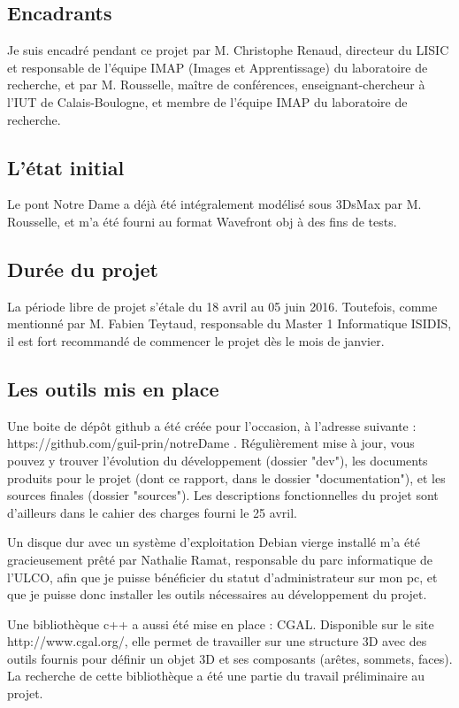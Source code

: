 \documentclass[a4paper,french]{article}
\begin{document}
		\subsection{Encadrants}
			Je suis encadré pendant ce projet par M. Christophe Renaud, directeur du LISIC et responsable de l'équipe IMAP (Images et Apprentissage) du laboratoire de recherche, et par M. Rousselle, maître de conférences, enseignant-chercheur à l'IUT de Calais-Boulogne, et membre de l'équipe IMAP du laboratoire de recherche.
		\subsection{L'état initial}
			Le pont Notre Dame a déjà été intégralement modélisé sous 3DsMax par M. Rousselle, et m'a été fourni au format Wavefront obj à des fins de tests. 
		\subsection{Durée du projet}
			La période libre de projet s'étale du 18 avril au 05 juin 2016. Toutefois, comme mentionné par M. Fabien Teytaud, responsable du Master 1 Informatique ISIDIS, il est fort recommandé de commencer le projet dès le mois de janvier.
		\subsection{Les outils mis en place}
			Une boite de dépôt github a été créée pour l'occasion, à l'adresse suivante :  https://github.com/guil-prin/notreDame . Régulièrement mise à jour, vous pouvez y trouver l'évolution du développement (dossier "dev"), les documents produits pour le projet (dont ce rapport, dans le dossier "documentation"), et les sources finales (dossier "sources"). Les descriptions fonctionnelles du projet sont d'ailleurs dans le cahier des charges fourni le 25 avril. \par
			Un disque dur avec un système d'exploitation Debian vierge installé m'a été gracieusement prêté par Nathalie Ramat, responsable du parc informatique de l'ULCO, afin que je puisse bénéficier du statut d'administrateur sur mon pc, et que je puisse donc installer les outils nécessaires au développement du projet. \par
			Une bibliothèque c++ a aussi été mise en place : CGAL. Disponible sur le site http://www.cgal.org/, elle permet de travailler sur une structure 3D avec des outils fournis pour définir un objet 3D et ses composants (arêtes, sommets, faces). La recherche de cette bibliothèque a été une partie du travail préliminaire au projet.
		\newpage
\end{document}
